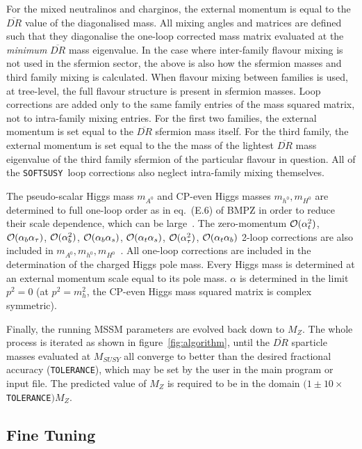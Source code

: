 \documentclass[]{article}
\def\at{\alpha_t}
\def\ab{\alpha_b}
\def\as{\alpha_s}
\def\atau{\alpha_{\tau}}
\def\oatab{{\cal O}(\at\ab)}
\def\oatas{{\cal O}(\at\as)}
\def\oabas{{\cal O}(\ab\as)}
\def\oatq{{\cal O}(\at^2)}
\def\oabq{{\cal O}(\ab^2)}
\def\oatauq{{\cal O}(\atau^2)}
\def\oabatau{{\cal O}(\ab \atau)}
\def\SOFTSUSY{{\tt SOFTSUSY}}
\def\code#1{\small{\tt #1}\normalsize}
\begin{document}
For the mixed neutralinos and charginos, the
external momentum is equal to the $\overline{DR}$ value of the diagonalised
mass.
All mixing angles and matrices are defined such that they diagonalise
the one-loop corrected mass matrix evaluated at the {\em minimum}
$\overline{DR}$ mass eigenvalue. In the case where inter-family flavour mixing
is not used in the sfermion sector, the above is also how the sfermion masses
and third family mixing is calculated. 
When flavour mixing between families is used, at
tree-level, the full flavour structure is present in sfermion masses.
Loop corrections are added only to the same family entries of the mass squared
matrix, not to
intra-family mixing entries. For the first two families, 
the external momentum is set equal to the $\overline{DR}$ sfermion mass
itself. For the third 
family, the external momentum is set equal to the the mass of the lightest
$\overline{DR}$ mass eigenvalue of the third family sfermion of the particular
flavour in question. 
All of the \SOFTSUSY~loop
corrections also neglect intra-family mixing themselves.

The pseudo-scalar Higgs  mass $m_{A^0}$ and CP-even Higgs masses $m_{h^0},
m_{H^0}$ are determined to full one-loop order
as in eq.~(E.6) of BMPZ in order to reduce
their scale dependence, which can be large~\cite{Katsikatsou:2000cd}. 
The zero-momentum $\oatq$, $\oabatau$, $\oabq$, $\oabas$, $\oatas$, $\oatauq$,
$\oatab$
2-loop corrections are 
also included in $m_{A^0}, m_{h^0},
m_{H^0}$~\cite{Degrassi:2001yf,Brignole:2001jy,Brignole:2002bz,Dedes:2003km}.
All one-loop corrections are included in
the determination of the charged Higgs pole mass.
Every Higgs mass is determined at an external momentum scale equal to its
pole mass. $\alpha$ is determined in the limit $p^2=0$ (at $p^2=m_h^2$, the
CP-even Higgs mass squared matrix is complex symmetric).

Finally, the running MSSM parameters are evolved back down to $M_Z$.
The whole process is iterated as shown in figure~\ref{fig:algorithm}, until the
$\overline{DR}$ sparticle masses evaluated at $M_{SUSY}$
all converge to better than the desired fractional accuracy
(\code{TOLERANCE}), which may be set by the user in the main program or input
file. The predicted value of $M_Z$ is required to be in the domain
$(1\pm10\times$\code{TOLERANCE}$)M_Z$.

\subsection{Fine Tuning \label{sec:finetune}}
\end{document}
